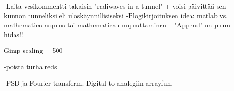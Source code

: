 -Laita vesikommentti takaisin "radiwaves in a tunnel" + voisi päivittää sen kunnon tunneliksi eli uloskäynnillisiseksi
-Blogikirjoituksen idea: matlab vs. mathematica nopeus tai mathematican nopeuttaminen – "Append" on pirun hidas!!

Gimp scaling = 500 


-poista turha reds

-PSD ja Fourier transform. Digital to analogiin arrayfun.
